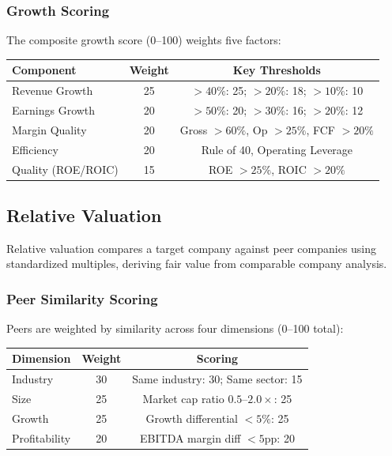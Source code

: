 \subsubsection{Growth Scoring}

The composite growth score (0--100) weights five factors:

\begin{center}
\begin{tabular}{lcc}
\textbf{Component} & \textbf{Weight} & \textbf{Key Thresholds} \\
\hline
Revenue Growth & 25 & $> 40\%$: 25; $> 20\%$: 18; $> 10\%$: 10 \\
Earnings Growth & 20 & $> 50\%$: 20; $> 30\%$: 16; $> 20\%$: 12 \\
Margin Quality & 20 & Gross $> 60\%$, Op $> 25\%$, FCF $> 20\%$ \\
Efficiency & 20 & Rule of 40, Operating Leverage \\
Quality (ROE/ROIC) & 15 & ROE $> 25\%$, ROIC $> 20\%$ \\
\end{tabular}
\end{center}

\newpage\subsection{Relative Valuation}

Relative valuation compares a target company against peer companies using standardized multiples, deriving fair value from comparable company analysis.

\subsubsection{Peer Similarity Scoring}

Peers are weighted by similarity across four dimensions (0--100 total):

\begin{center}
\begin{tabular}{lcc}
\textbf{Dimension} & \textbf{Weight} & \textbf{Scoring} \\
\hline
Industry & 30 & Same industry: 30; Same sector: 15 \\
Size & 25 & Market cap ratio $0.5$--$2.0\times$: 25 \\
Growth & 25 & Growth differential $< 5\%$: 25 \\
Profitability & 20 & EBITDA margin diff $< 5$pp: 20 \\
\end{tabular}
\end{center}

